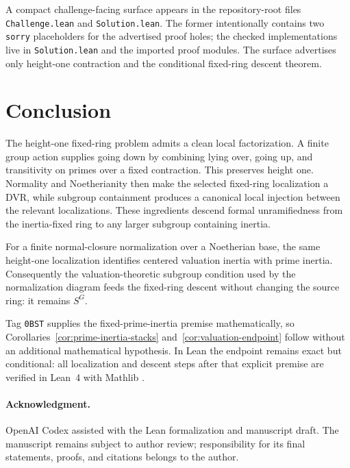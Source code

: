 \documentclass[11pt]{article}
\theoremstyle{remark}
\newcommand{\leanpath}[1]{\texttt{\nolinkurl{#1}}}
\begin{document}
A compact challenge-facing surface appears in the repository-root files
\leanpath{Challenge.lean} and \leanpath{Solution.lean}.  The former
intentionally contains two \leanpath{sorry} placeholders for the advertised
proof holes; the checked implementations live in \leanpath{Solution.lean}
and the imported proof modules.  The surface advertises only height-one
contraction and the conditional fixed-ring descent theorem.

\section{Conclusion}
\label{sec:conclusion}

The height-one fixed-ring problem admits a clean local factorization.  A
finite group action supplies going down by combining lying over, going up,
and transitivity on primes over a fixed contraction.  This preserves height
one.  Normality and Noetherianity then make the selected fixed-ring
localization a DVR, while subgroup containment produces a canonical local
injection between the relevant localizations.  These ingredients descend
formal unramifiedness from the inertia-fixed ring to any larger subgroup
containing inertia.

For a finite normal-closure normalization over a Noetherian base, the same
height-one localization identifies centered valuation inertia with prime
inertia.  Consequently the valuation-theoretic subgroup condition used by
the normalization diagram feeds the fixed-ring descent without changing
the source ring: it remains \(S^G\).

Tag \texttt{0BST} supplies the fixed-prime-inertia premise mathematically,
so Corollaries~\ref{cor:prime-inertia-stacks}
and~\ref{cor:valuation-endpoint} follow without an additional mathematical
hypothesis.  In Lean the endpoint remains exact but conditional: all
localization and descent steps after that explicit premise are verified in
Lean~4 with Mathlib \cite{Lean4,Mathlib}.

\paragraph{Acknowledgment.}
OpenAI Codex assisted with the Lean formalization and manuscript draft.
The manuscript remains subject to author review; responsibility for its
final statements, proofs, and citations belongs to the author.

\begingroup
\small


\endgroup
\end{document}

